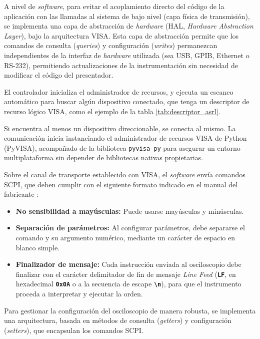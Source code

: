 A nivel de \emph{software}, para evitar el acoplamiento directo del código de la aplicación con las llamadas al sistema de bajo nivel (capa física de transmisión), se implementa una capa de abstracción de \emph{hardware} (HAL, \emph{Hardware Abstraction Layer}), bajo la arquitectura VISA. Esta capa de abstracción permite que los comandos de consulta (\textit{queries}) y configuración (\textit{writes}) permanezcan independientes de la interfaz de \emph{hardware} utilizada (sea USB, GPIB, Ethernet o RS-232), permitiendo actualizaciones de la instrumentación sin necesidad de modificar el código del presentador.

El controlador inicializa el administrador de recursos, y ejecuta un escaneo automático para buscar algún dispositivo conectado, que tenga un descriptor de recurso lógico VISA, como el ejemplo de la tabla \ref{tab:descriptor_asrl}.

Si encuentra al menos un dispositivo direccionable, se conecta al mismo. La comunicación inicia instanciando el administrador de recursos VISA de Python (PyVISA), acompañado de la biblioteca \texttt{pyvisa-py} para asegurar un entorno multiplataforma sin depender de bibliotecas nativas propietarias.

Sobre el canal de transporte establecido con VISA, el \emph{software} envía comandos SCPI, que deben cumplir con el siguiente formato indicado en el manual del fabricante \cite{gds1000au_ProgrammingManual}:
\begin{itemize}
    \item \textbf{No sensibilidad a mayúsculas:} Puede usarse mayúsculas y minúsculas.
    \item \textbf{Separación de parámetros:} Al configurar parámetros, debe separarse el comando y su argumento numérico, mediante un carácter de espacio en blanco simple.
    \item \textbf{Finalizador de mensaje:} Cada instrucción enviada al osciloscopio debe finalizar con el carácter delimitador de fin de mensaje \emph{Line Feed} (\textbf{\texttt{LF}}, en hexadecimal \textbf{\texttt{0x0A}} o a la secuencia de escape \textbf{\texttt{\textbackslash n}}), para que el instrumento proceda a interpretar y ejecutar la orden.
\end{itemize}

Para gestionar la configuración del osciloscopio de manera robusta, se implementa una arquitectura, basada en métodos de consulta (\emph{getters}) y configuración (\emph{setters}), que encapsulan los comandos SCPI.

